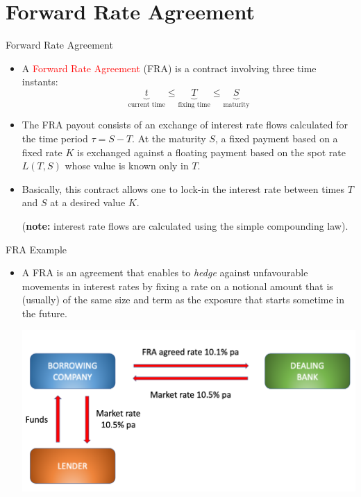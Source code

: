 \documentclass{beamer}
\begin{document}
\section{Forward Rate Agreement}
\begin{frame}{Forward Rate Agreement}
	\begin{itemize}	
		\item<1-> A \textcolor{red}{Forward Rate Agreement} (FRA) is a contract involving three time instants: %
		\begin{equation*}
			\underbrace{t}_{\text{current time}} \leq \underbrace{T}_{\text{fixing time}} \leq\underbrace{S}_{\text{maturity}}
		\end{equation*}
		\item<2-> The FRA payout consists of an exchange of interest rate flows calculated for the time period $\tau=S-T$. At the maturity $S$, a fixed payment based on a fixed rate $K$ is exchanged against a floating payment based on the spot rate $L(T, S)$ whose value is known only in $T$.
		\item<3-> Basically, this contract allows one to lock-in the interest rate between times $T$ and $S$ at a desired value $K$.
		 
		\noindent
		(\textbf{note:} interest rate flows are calculated using the simple compounding law).
	\end{itemize}
\end{frame}

\begin{frame}{FRA Example}
	\begin{itemize}
	\item A FRA is an agreement that enables to \emph{hedge} against unfavourable movements in interest rates by fixing a rate on a notional amount that is (usually) of the same size and term as the exposure that starts sometime in the future. 
	\vfill
	\begin{center}
		\includegraphics[width=0.9\linewidth]{images/FRA_diagram}
	\end{center}
	\end{itemize}
\end{frame}
\end{document}
